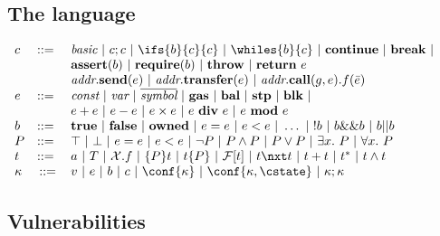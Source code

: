 \subsection{The language}
$
\begin{array}{lcl}
	c&::=~&\textit{basic}~|~c;c~|~\ifs{b}{c}{c}~|~\whiles{b}{c}~|~\textbf{continue}~|~\textbf{break}~|~\\
	&& \textbf{assert}(b)~|~\textbf{require}(b)~|~\textbf{throw}~|~\textbf{return}~ e\\
	&&\textit{addr}.\textbf{send}(e)~|~\textit{addr}.\textbf{transfer}(e)~|~\textit{addr}.\textbf{call}(g,e).f(\bar{e}) \\
	e&::=~&\textit{const}~|~\textit{var}~|~\overline{\textit{symbol}}~|~\textbf{gas}~|~\textbf{bal}~|~ \textbf{stp}~|~\textbf{blk}~|~\\
	&~&e + e~|~ e - e~|~ e \times e ~|~ e~\textbf{div}~e~|~ e~\textbf{mod}~e\\
	b&::=~&\textbf{true}~|~\textbf{false}~|~\textbf{owned}~|~ e = e~|~ e < e~|~\ldots ~|~ !b~|~ b \&\& b  ~|~ b || b\\
	P&::=~&\top~|~\bot~|~ e = e~|~ e < e~|~ \neg P~|~P \wedge P ~|~ P \vee P ~|~ \exists x.~P~|~ \forall x.~P\\
	t&::=~&a~|~T~|~\mathcal{X}.f~|~\{P\}t~|~t\{P\}~|~\mathcal{F}[t]~|~t \nxt t~|~t+t~|~t^*~|~ t \wedge t\\
	\kappa&::=&v~|~e~|~b~|~c~|~\conf{\kappa}~|~\conf{\kappa,\cstate}~|~\kappa ; \kappa
\end{array}
$
\subsection{Vulnerabilities}


